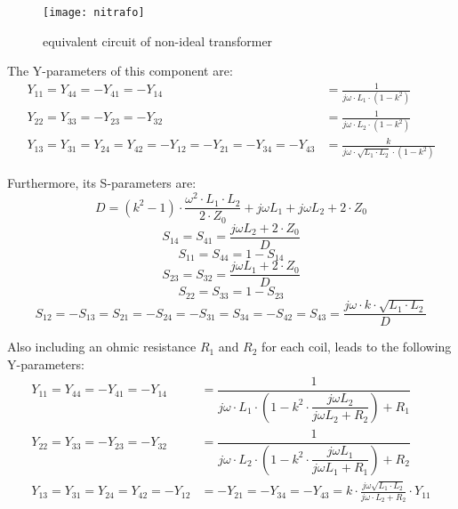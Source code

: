 \begin{figure}[ht]
\begin{center}
\texttt{[image: nitrafo]}
\end{center}
\caption{equivalent circuit of non-ideal transformer}
\label{fig:nitrafo}
\end{figure}
\FloatBarrier

The Y-parameters of this component are:
\begin{align}
Y_{11} = Y_{44} = -Y_{41} = -Y_{14} &= \frac{1}{j\omega\cdot L_1\cdot (1-k^2)}\\
Y_{22} = Y_{33} = -Y_{23} = -Y_{32} &= \frac{1}{j\omega\cdot L_2\cdot (1-k^2)}\\
Y_{13} = Y_{31} = Y_{24} = Y_{42} = -Y_{12} = -Y_{21} = -Y_{34} = -Y_{43} &=
  \frac{k}{j\omega\cdot\sqrt{L_1\cdot L_2}\cdot (1-k^2)}
\end{align}

Furthermore, its S-parameters are:
\begin{equation}
D = (k^2 - 1) \cdot \dfrac{\omega^2\cdot L_1\cdot L_2}{2\cdot Z_0} +
    j\omega L_1 + j\omega L_2 + 2\cdot Z_0
\end{equation}
\begin{equation}
S_{14} = S_{41} = \frac{j\omega L_2 + 2\cdot Z_0}{D}
\end{equation}
\begin{equation}
S_{11} = S_{44} = 1 - S_{14}
\end{equation}
\begin{equation}
S_{23} = S_{32} = \frac{j\omega L_1 + 2\cdot Z_0}{D}
\end{equation}
\begin{equation}
S_{22} = S_{33} = 1 - S_{23}
\end{equation}
\begin{equation}
S_{12} = -S_{13} = S_{21} = -S_{24} = -S_{31} = S_{34} = -S_{42} = S_{43} =
         \dfrac{j\omega\cdot k \cdot\sqrt{L_1\cdot L_2}}{D}
\end{equation}

Also including an ohmic resistance $R_1$ and $R_2$ for each coil,
leads to the following Y-parameters:
\begin{align}
Y_{11} = Y_{44} = -Y_{41} = -Y_{14} &
  = \dfrac{1}{j\omega\cdot L_1\cdot \left(1-k^2\cdot\dfrac{j\omega L_2}{j\omega L_2 + R_2}\right) + R_1}\\
Y_{22} = Y_{33} = -Y_{23} = -Y_{32} &
  = \dfrac{1}{j\omega\cdot L_2\cdot \left(1-k^2\cdot\dfrac{j\omega L_1}{j\omega L_1 + R_1}\right) + R_2}\\
Y_{13} = Y_{31} = Y_{24} = Y_{42} = -Y_{12} &= -Y_{21} = -Y_{34} = -Y_{43} =
  k\cdot\frac{j\omega\sqrt{L_1\cdot L_2}}{j\omega\cdot L_2 + R_2}\cdot Y_{11}
\end{align}


